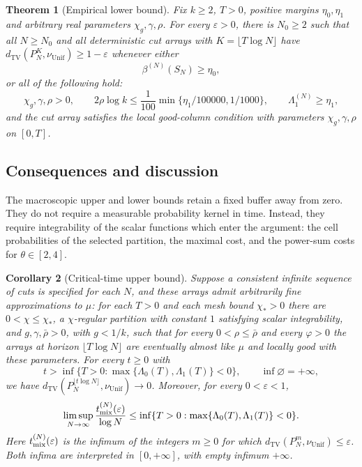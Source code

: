 \documentclass[11pt]{article}
\numberwithin{equation}{section}
\newtheorem{theorem}{Theorem}[section]
\newtheorem{corollary}[theorem]{Corollary}
\theoremstyle{definition}
\theoremstyle{remark}
\newcommand{\TV}{\mathrm{TV}}
\newcommand{\Unif}{\mathrm{Unif}}
\newcommand{\dTV}{d_{\TV}}
\newcommand{\nuUnif}{\nu_{\Unif}}
\newcommand{\1}{\mathbf 1}
\begin{document}
\begin{theorem}[Empirical lower bound]\label{thm:empirical-lower}
Fix $k\ge2$, $T>0$, positive margins $\eta_0,\eta_1$ and arbitrary real parameters
$\chi_g,\gamma,\rho$. For every $\varepsilon>0$, there is $N_0\ge2$ such
that all $N\ge N_0$ and all deterministic cut arrays with $K=\lfloor T\log N\rfloor$ have
$\dTV(P_N^K,\nuUnif)\ge1-\varepsilon$ whenever either
\[
 \beta^{(N)}(S_N)\ge\eta_0,
\]
or all of the following hold:
\[
 \chi_g,\gamma,\rho>0,\qquad
 2\rho\log k\le\frac1{100}\min\{\eta_1/100000,1/1000\},\qquad
 \Lambda_1^{(N)}\ge\eta_1,
\]
and the cut array satisfies the local good-column condition with
parameters $\chi_g,\gamma,\rho$ on $[0,T]$.
\end{theorem}

\subsection{Consequences and discussion}

The macroscopic upper and lower bounds retain a fixed buffer away from
zero. They do not require a measurable probability kernel in time. Instead,
they require integrability of the scalar functions which enter the
argument: the cell probabilities of the selected partition, the maximal
cost, and the power-sum costs for $\theta\in[2,4]$.

\begin{corollary}[Critical-time upper bound]\label{cor:upper-critical}
Suppose a consistent infinite sequence of cuts is specified for each
$N$, and these arrays admit arbitrarily fine approximations to $\mu$:
for each $T>0$ and each mesh bound $\chi_*>0$ there are
$0<\chi\le\chi_*$, a $\chi$-regular partition with constant $1$ satisfying
scalar integrability, and $g,\gamma,\bar\rho>0$, with $g<1/k$,
such that for every $0<\rho\le\bar\rho$ and every $\varphi>0$ the
arrays at horizon $\lfloor T\log N\rfloor$ are eventually almost
like $\mu$ and locally good with these parameters. For every $t\ge0$ with
\[
 t>\inf\{T>0:\max\{\Lambda_0(T),\Lambda_1(T)\}<0\},
 \qquad \inf\varnothing=+\infty,
\]
we have $\dTV(P_N^{\lfloor t\log N\rfloor},\nuUnif)\to0$.
Moreover, for every $0<\varepsilon<1$,
\[
 \limsup_{N\to\infty}\frac{t_{\rm mix}^{(N)}(\varepsilon)}{\log N}
       \le\inf\{T>0:\max\{\Lambda_0(T),\Lambda_1(T)\}<0\}.
\]
Here $t_{\rm mix}^{(N)}(\varepsilon)$ is the infimum of the integers
$m\ge0$ for which $\dTV(P_N^m,\nuUnif)\le\varepsilon$.
Both infima are interpreted in $[0,+\infty]$, with empty infimum
$+\infty$.
\end{corollary}
\end{document}
